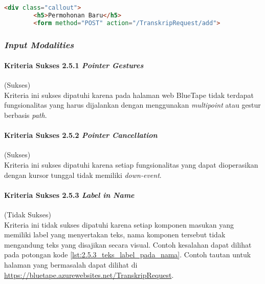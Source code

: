 \begin{lstlisting}[frame=single, label={lst:2.4.10_heading_tidak_tepat}, language=HTML, caption=Kriteria Sukses 2.4.10 - Penggunaan \textit{Heading} Tidak Tepat]
    <div class="callout">
        <h5>Permohonan Baru</h5>
        <form method="POST" action="/TranskripRequest/add">
\end{lstlisting}

\subsubsection{\textit{Input Modalities}}
\label{subsubsec:kepatuhan_bluetape_input_modalities}

\paragraph{Kriteria Sukses 2.5.1 \textit{Pointer Gestures}}
\label{par:kepatuhan_bluetape_kriteria_sukses_2.5.1}
(Sukses)\\

Kriteria ini sukses dipatuhi karena pada halaman web BlueTape tidak terdapat fungsionalitas yang harus dijalankan dengan menggunakan \textit{multipoint} atau gestur berbasis \textit{path}.

\paragraph{Kriteria Sukses 2.5.2 \textit{Pointer Cancellation}}
\label{par:kepatuhan_bluetape_kriteria_sukses_2.5.2}
(Sukses)\\

Kriteria ini sukses dipatuhi karena setiap fungsionalitas yang dapat dioperasikan dengan kursor tunggal tidak memiliki \textit{down-event}.

\paragraph{Kriteria Sukses 2.5.3 \textit{Label in Name}}
\label{par:kepatuhan_bluetape_kriteria_sukses_2.5.3}
(Tidak Sukses)\\

Kriteria ini tidak sukses dipatuhi karena setiap komponen masukan yang memiliki label yang menyertakan teks, nama komponen tersebut tidak mengandung teks yang disajikan secara visual. Contoh kesalahan dapat dilihat pada potongan kode \ref{lst:2.5.3_teks_label_pada_nama}. Contoh tautan untuk halaman yang bermasalah dapat dilihat di \url{https://bluetape.azurewebsites.net/TranskripRequest}.

